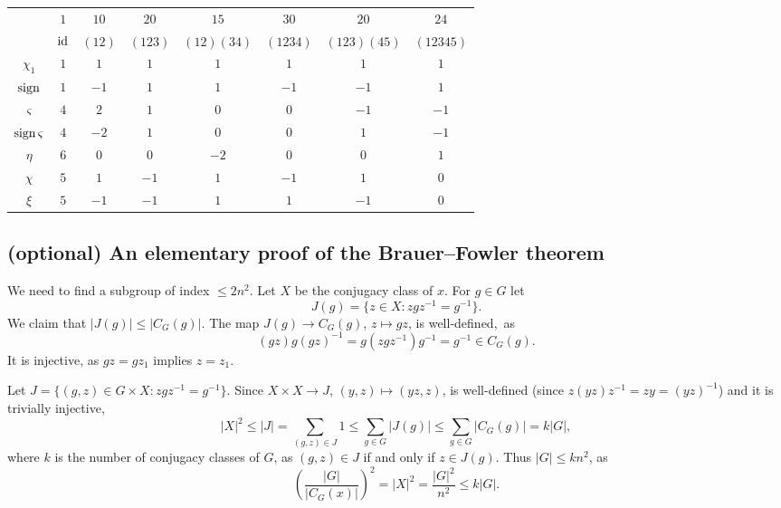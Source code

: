 \bigskip 
\begin{center}
    \begin{tabular}{|c|ccccccc|}
        \hline 
        & $1$ & $10$ & $20$ & $15$ & $30$ & $20$ & $24$ \\
        & $\operatorname{id}$ & $(12)$ & $(123)$ & $(12)(34)$ & $(1234)$ & $(123)(45)$  & $(12345)$ \\
        \hline 
        $\chi_1$ & $1$ & $1$ & $1$ & $1$ & $1$ & $1$ & $1$ \\
        $\operatorname{sign}$ & $1$ & $-1$ & $1$ & $1$ & $-1$ & $-1$ & $1$ \\
        $\varsigma$ & $4$ & $2$ & $1$ & $0$ & $0$ & $-1$ & $-1$ \\
        $\operatorname{sign}\varsigma$ & $4$ & $-2$ & $1$ & $0$ & $0$ & $1$ & $-1$ \\
        $\eta$ & $6$ & $0$ & $0$ & $-2$ & $0$ & $0$ & $1$ \\
        $\chi$ & $5$ & $1$ & $-1$ & $1$ & $-1$ & $1$ & $0$ \\
        $\xi$ & $5$ & $-1$ & $-1$ & $1$ & $1$ & $-1$ & $0$ \\
        \hline 
    \end{tabular}
\end{center}
\bigskip 



\subsection{(optional) An elementary proof of the Brauer--Fowler theorem}

We need to find a subgroup of index $\leq 2n^2$. 
Let $X$ be the conjugacy class of $x$. For $g\in G$ let
\[
J(g)=\{z\in X:zgz^{-1}=g^{-1}\}.
\]
We claim that $|J(g)|\leq|C_G(g)|$. The map $J(g)\to C_G(g)$, $z\mapsto gz$, 
is well-defined,~as 
\[
(gz)g(gz)^{-1}=g(zgz^{-1})g^{-1}=g^{-1}\in C_G(g).
\]
It is injective, as $gz=gz_1$ implies $z=z_1$.

Let $J=\{(g,z)\in G\times X:zgz^{-1}=g^{-1}\}$.  
Since $X\times X\to J$, $(y,z)\mapsto (yz,z)$, 
is well-defined (since $z(yz)z^{-1}=zy=(yz)^{-1}$) and
it is trivially injective, 
\[
|X|^2\leq |J|=\sum_{(g,z)\in J}1\leq\sum_{g\in G}|J(g)|
\leq\sum_{g\in G}|C_G(g)|=k|G|,
\]
where $k$ is the number of conjugacy classes of $G$, 
as $(g,z)\in J$ if and only if $z\in J(g)$. Thus $|G|\leq kn^2$, as
\[
\left(\frac{|G|}{|C_G(x)|}\right)^2=|X|^2=\frac{|G|^2}{n^2}\leq k|G|.
\]

